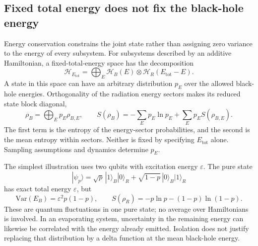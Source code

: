 \documentclass[11pt,letterpaper]{article}
\theoremstyle{plain}
\theoremstyle{definition}
\theoremstyle{remark}
\newcommand{\Hcal}{\mathcal{H}}
\newcommand{\Var}{\text{Var}}
\begin{document}
\subsection{Fixed total energy does not fix the black-hole energy}
\label{subsec08:energy_constraints}

Energy conservation constrains the joint state rather than assigning
zero variance to the energy of every subsystem. For subsystems described
by an additive Hamiltonian, a fixed-total-energy space has the
decomposition
\begin{equation}
 \Hcal_{E_{\mathrm{tot}}}
 =\bigoplus_E\Hcal_B(E)\otimes
                  \Hcal_R(E_{\mathrm{tot}}-E).
 \label{eq08:energy_shell}
\end{equation}
A state in this space can have an arbitrary distribution $p_E$ over
the allowed black-hole energies. Orthogonality of the radiation energy
sectors makes its reduced state block diagonal,
\begin{equation}
 \rho_B=\bigoplus_Ep_E\rho_{B,E},\qquad
 S(\rho_B)=-\sum_Ep_E\ln p_E+
                     \sum_Ep_E S(\rho_{B,E}).
 \label{eq08:sector_entropy}
\end{equation}
The first term is the entropy of the energy-sector probabilities, and
the second is the mean entropy within sectors. Neither is fixed by
specifying $E_{\mathrm{tot}}$ alone. Sampling assumptions and dynamics
determine $p_E$.

The simplest illustration uses two qubits with excitation energy
$\varepsilon$. The pure state
\begin{equation}
 |\psi_p\rangle
 =\sqrt p\,|1\rangle_B|0\rangle_R
  +\sqrt{1-p}\,|0\rangle_B|1\rangle_R
 \label{eq08:fixed_energy_example}
\end{equation}
has exact total energy $\varepsilon$, but
\begin{equation}
 \Var(E_B)=\varepsilon^2p(1-p),\qquad
 S(\rho_R)=-p\ln p-(1-p)\ln(1-p).
 \label{eq08:fixed_energy_variance}
\end{equation}
These are quantum fluctuations in one pure state; no average over
Hamiltonians is involved. In an evaporating system, uncertainty in the
remaining energy can likewise be correlated with the energy already
emitted. Isolation does not justify replacing that distribution by a
delta function at the mean black-hole energy.
\end{document}
